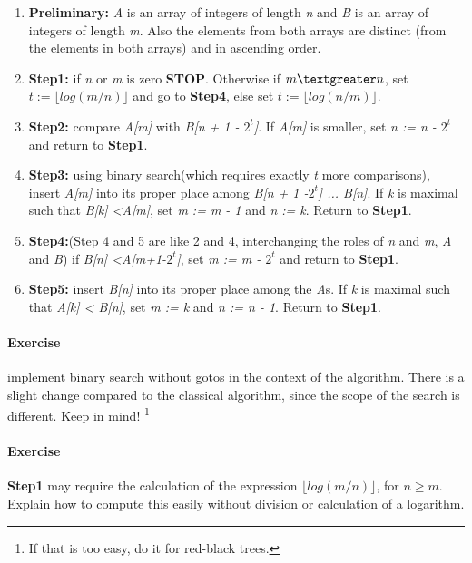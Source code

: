 \documentclass{article}
\newcommand{\percents}[1]{\protect \marginpar[l]{\bf [#1]}}
\newcounter{question}
\newcommand{\question}[1]{
  \addtocounter{question}{1}
  \paragraph{Exercise~\arabic{question}  \percents{#1}}
 }
\begin{document}
\begin{enumerate}
\item \textbf {Preliminary:} {\it A} is an array of integers of length
  {\it n} and {\it B} is an array of integers of length {\it m}. Also
  the elements from both arrays are distinct (from the elements in
  both arrays) and in ascending order. 

\item \textbf{Step1:} if {\it n} or {\it m} is zero
  \textbf{STOP}. Otherwise if  $m\textgreater n$, set $t := \lfloor log
    \left ( m \slash n \right ) \rfloor $  and go to \textbf{Step4},
    else set $t := \lfloor log
    \left ( n \slash m \right ) \rfloor $.

\item \textbf{Step2:} compare {\it A[m]} with {\it B[n + 1 -
    $2^t$]}. If {\it A[m]} is smaller, set {\it n := n - $2^t$} and
  return to \textbf{Step1}.

\item \textbf{Step3:} using binary search(which requires exactly {\it
    t} more comparisons), insert {\it A[m]} into its proper place
  among {\it B[n + 1 -$2^t$] ... B[n]}. If {\it k} is maximal such
  that {\it B[k] \textless A[m]}, set {\it m := m - 1} and {\it n :=
    k}. Return to \textbf{Step1}.

\item \textbf{Step4:}(Step 4 and 5 are like 2 and 4, interchanging the
  roles of {\it n} and {\it m}, {\it A} and {\it B}) if {\it B[n]
    \textless A[m+1-$2^t$]}, set {\it m := m - $2^t$} and return to
  \textbf{Step1}.

\item \textbf{Step5:} insert {\it B[n]} into its proper place among
  the {\it A}s. If {\it k} is maximal such that {\it A[k] \textless
    B[n]}, set {\it m := k} and {\it n := n - 1}. Return to \textbf{Step1}.


\end{enumerate}


\question{*} 

implement binary search without gotos in the context of the
algorithm. There is a slight change compared to the classical
algorithm, since the scope of the search is different. Keep in mind! 
\footnote{If that is too easy, do it for red-black trees.}


\question{*} 

\textbf{Step1} may require the calculation of the expression $\lfloor log
    \left ( m \slash n \right ) \rfloor $, for $n \geq m$. Explain how
    to compute this easily without division or calculation of a
    logarithm.  %
\end{document}
